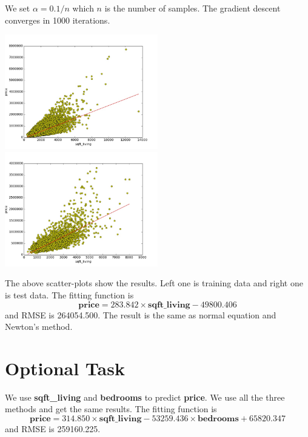 \documentclass{article}
\begin{document}
We set $\alpha=0.1/n$ which $n$ is the number of samples. The gradient descent converges in 1000 iterations.

\includegraphics[width=0.5\textwidth]{../result/required_train_gradient_descent.jpg}
\includegraphics[width=0.5\textwidth]{../result/required_test_gradient_descent.jpg}

The above scatter-plots show the results. Left one is training data and right one is test data. The fitting function is $$\mathbf{price}=283.842\times\mathbf{sqft\_living}-49800.406$$ and RMSE is 264054.500. The result is the same as normal equation and Newton's method.

\section{Optional Task}
We use {\bf sqft\_living} and {\bf bedrooms} to predict {\bf price}. We use all the three methods and get the same results. The fitting function is $$\mathbf{price}=314.850\times\mathbf{sqft\_living} -53259.436\times\mathbf{bedrooms}+65820.347$$ and RMSE is 259160.225.
\end{document}
